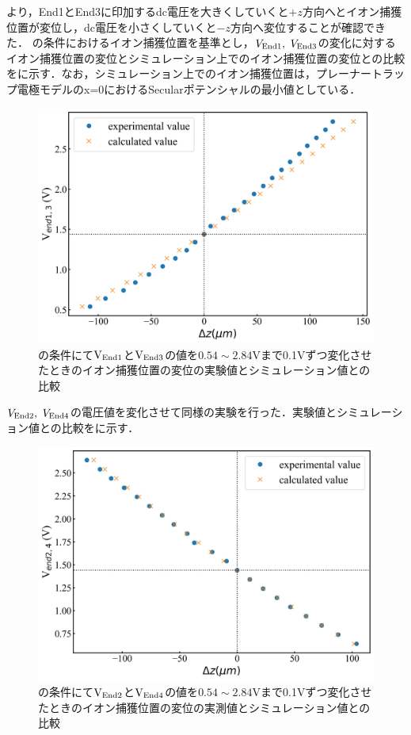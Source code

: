 より，End1とEnd3に印加するdc電圧を大きくしていくと$+z$方向へとイオン捕獲位置が変位し，dc電圧を小さくしていくと$-z$方向へ変位することが確認できた．
%
\clearpage
%
の条件におけるイオン捕獲位置を基準とし，$V_{\rm End1}, \ V_{\rm End3}$の変化に対するイオン捕獲位置の変位とシミュレーション上でのイオン捕獲位置の変位との比較をに示す．なお，シミュレーション上でのイオン捕獲位置は，プレーナートラップ電極モデルのx=0におけるSecularポテンシャルの最小値としている．
\begin{figure}[h]
	\begin{center}
		\includegraphics[width = 0.6\linewidth]{./results/figure/out_V13.jpg}
		\caption{の条件にて${\rm V}_{\rm End1}$と${\rm V}_{\rm End3}$の値を$0.54 \sim 2.84$Vまで0.1Vずつ変化させたときのイオン捕獲位置の変位の実験値とシミュレーション値との比較}
		\label{fig:sim_exp_displacement_End13}
	\end{center}
\end{figure}

$V_{\rm End2}, \ V_{\rm End4}$の電圧値を変化させて同様の実験を行った．実験値とシミュレーション値との比較をに示す．

\begin{figure}[h]
	\begin{center}
		\includegraphics[width = 0.6\linewidth]{./results/figure/out_V24.jpg}
		\caption{の条件にて${\rm V}_{\rm End2}$と${\rm V}_{\rm End4}$の値を$0.54 \sim 2.84$Vまで0.1Vずつ変化させたときのイオン捕獲位置の変位の実測値とシミュレーション値との比較}
			\label{fig:sim_exp_displacement_End24}
	\end{center}
\end{figure}

